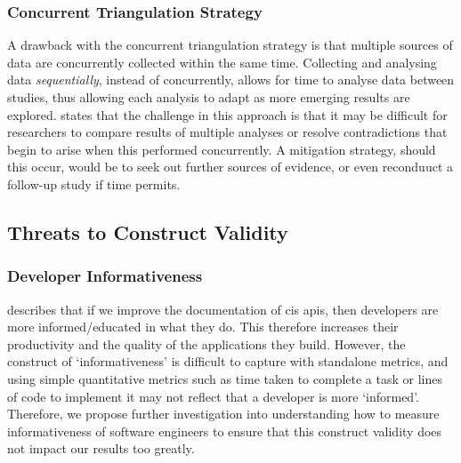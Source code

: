 \subsubsection{Concurrent Triangulation Strategy}

A drawback with the concurrent triangulation strategy is that multiple sources of data are concurrently collected within the same time. Collecting and analysing data \textit{sequentially}, instead of concurrently, allows for time to analyse data between studies, thus allowing each analysis to adapt as more emerging results are explored. \citet{Easterbrook:2007ws} states that the challenge in this approach is that it may be difficult for researchers to compare results of multiple analyses or resolve contradictions that begin to arise when this performed concurrently. A mitigation strategy, should this occur, would be to seek out further sources of evidence, or even reconduuct a follow-up study if time permits.

\subsection{Threats to Construct Validity}

\subsubsection{Developer Informativeness}

 describes that if we improve the documentation of \gls{cis} \glspl{api}, then developers are more informed/educated in what they do. This therefore increases their productivity and the quality of the applications they build. However, the construct of `informativeness' is difficult to capture with standalone metrics, and using simple quantitative metrics such as time taken to complete a task or lines of code to implement it may not reflect that a developer is more `informed'. Therefore, we propose further investigation into understanding how to measure informativeness of software engineers to ensure that this construct validity does not impact our results too greatly.



